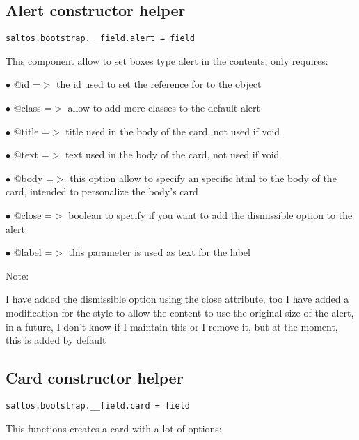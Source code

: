 \documentclass[a4paper]{book}
\begin{document}
\hypertarget{toc460}{}
\subsection{Alert constructor helper}

\begin{lstlisting}
saltos.bootstrap.__field.alert = field
\end{lstlisting}

This component allow to set boxes type alert in the contents, only requires:

\begin{compactitem}
\item[\color{myblue}$\bullet$] @id    =$>$ the id used to set the reference for to the object
\item[\color{myblue}$\bullet$] @class =$>$ allow to add more classes to the default alert
\item[\color{myblue}$\bullet$] @title =$>$ title used in the body of the card, not used if void
\item[\color{myblue}$\bullet$] @text  =$>$ text used in the body of the card, not used if void
\item[\color{myblue}$\bullet$] @body  =$>$ this option allow to specify an specific html to the body of the card, intended
          to personalize the body's card
\item[\color{myblue}$\bullet$] @close =$>$ boolean to specify if you want to add the dismissible option to the alert
\item[\color{myblue}$\bullet$] @label =$>$ this parameter is used as text for the label
\end{compactitem}

Note:

I have added the dismissible option using the close attribute, too I have added a modification
for the style to allow the content to use the original size of the alert, in a future, I don't
know if I maintain this or I remove it, but at the moment, this is added by default

\hypertarget{toc461}{}
\subsection{Card constructor helper}

\begin{lstlisting}
saltos.bootstrap.__field.card = field
\end{lstlisting}

This functions creates a card with a lot of options:
\end{document}
